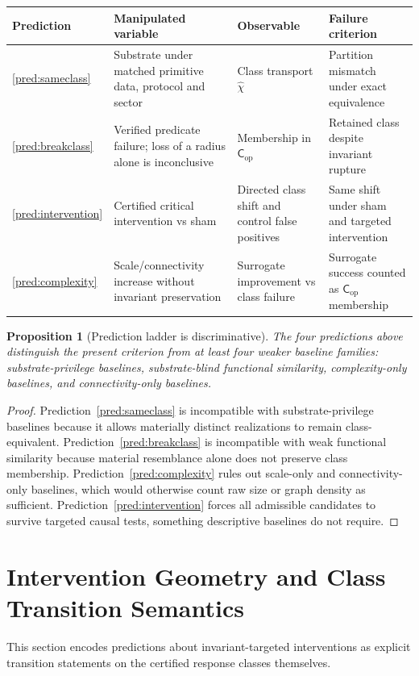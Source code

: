 \documentclass[11pt,a4paper]{article}
\newtheorem{proposition}[theorem]{Proposition}
\theoremstyle{definition}
\newcommand{\Cop}{\mathsf{C}_{\mathrm{op}}}
\begin{document}
\begin{center}
\begin{tabular}{p{2.2cm} p{3.4cm} p{3.5cm} p{3.1cm}}
\toprule
Prediction & Manipulated variable & Observable & Failure criterion \\
\midrule
\ref{pred:sameclass} & Substrate under matched primitive data, protocol and sector & Class transport $\widehat{\chi}$ & Partition mismatch under exact equivalence \\
\ref{pred:breakclass} & Verified predicate failure; loss of a radius alone is inconclusive & Membership in $\Cop$ & Retained class despite invariant rupture \\
\ref{pred:intervention} & Certified critical intervention vs sham & Directed class shift and control false positives & Same shift under sham and targeted intervention \\
\ref{pred:complexity} & Scale/connectivity increase without invariant preservation & Surrogate improvement vs class failure & Surrogate success counted as $\Cop$ membership \\
\bottomrule
\end{tabular}
\end{center}

\begin{proposition}[Prediction ladder is discriminative]\label{prop:ladder}
The four predictions above distinguish the present criterion from at least four weaker baseline families: substrate-privilege baselines, substrate-blind functional similarity, complexity-only baselines, and connectivity-only baselines.
\end{proposition}

\begin{proof}
Prediction~\ref{pred:sameclass} is incompatible with substrate-privilege baselines because it allows materially distinct realizations to remain class-equivalent. Prediction~\ref{pred:breakclass} is incompatible with weak functional similarity because material resemblance alone does not preserve class membership. Prediction~\ref{pred:complexity} rules out scale-only and connectivity-only baselines, which would otherwise count raw size or graph density as sufficient. Prediction~\ref{pred:intervention} forces all admissible candidates to survive targeted causal tests, something descriptive baselines do not require.
\end{proof}



\section{Intervention Geometry and Class Transition Semantics}
This section encodes predictions about invariant-targeted interventions as explicit transition statements on the certified response classes themselves.
\end{document}

